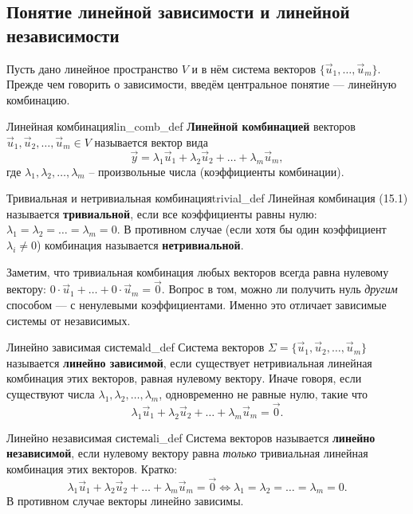 \documentclass[12pt,a4paper]{article}
\begin{document}
\subsection*{Понятие линейной зависимости и линейной независимости}

Пусть дано линейное пространство $V$ и в нём система векторов $\{\vec{u}_1,
\dots, \vec{u}_m\}$. Прежде чем говорить о зависимости, введём центральное
понятие — линейную комбинацию.

\begin{definition}{Линейная комбинация}{lin_comb_def}
  \textbf{Линейной комбинацией} векторов $\vec{u}_1, \vec{u}_2, \dots,
  \vec{u}_m \in V$ называется вектор вида
  \begin{equation}
    \vec{y} = \lambda_1 \vec{u}_1 + \lambda_2 \vec{u}_2 + \dots +
    \lambda_m \vec{u}_m,
    \tag{15.1}
  \end{equation}
  где $\lambda_1, \lambda_2, \dots, \lambda_m$ -- произвольные числа
  (коэффициенты комбинации).
\end{definition}

\begin{definition}{Тривиальная и нетривиальная комбинация}{trivial_def}
  Линейная комбинация (15.1) называется \textbf{тривиальной}, если все
  коэффициенты равны нулю: $\lambda_1 = \lambda_2 = \dots = \lambda_m =
  0$. В противном случае (если хотя бы один коэффициент $\lambda_i \neq
  0$) комбинация называется \textbf{нетривиальной}.
\end{definition}

Заметим, что тривиальная комбинация любых векторов всегда равна нулевому
вектору: $0\cdot\vec{u}_1 + \dots + 0\cdot\vec{u}_m = \vec{0}$. Вопрос в
том, можно ли получить нуль \emph{другим} способом — с ненулевыми
коэффициентами. Именно это отличает зависимые системы от независимых.

\begin{definition}{Линейно зависимая система}{ld_def}
  Система векторов $\Sigma = \{\vec{u}_1, \vec{u}_2, \dots, \vec{u}_m\}$
  называется \textbf{линейно зависимой}, если существует нетривиальная
  линейная комбинация этих векторов, равная нулевому вектору. Иначе
  говоря, если существуют числа $\lambda_1, \lambda_2, \dots, \lambda_m$,
  одновременно не равные нулю, такие что
  \[
    \lambda_1 \vec{u}_1 + \lambda_2 \vec{u}_2 + \dots + \lambda_m
    \vec{u}_m = \vec{0}.
  \]
\end{definition}

\begin{definition}{Линейно независимая система}{li_def}
  Система векторов называется \textbf{линейно независимой}, если нулевому
  вектору равна \emph{только} тривиальная линейная комбинация этих
  векторов. Кратко:
  \[
    \lambda_1 \vec{u}_1 + \lambda_2 \vec{u}_2 + \dots + \lambda_m
    \vec{u}_m = \vec{0}
    \iff
    \lambda_1 = \lambda_2 = \dots = \lambda_m = 0.
  \]
  В противном случае векторы линейно зависимы.
\end{definition}
\end{document}
